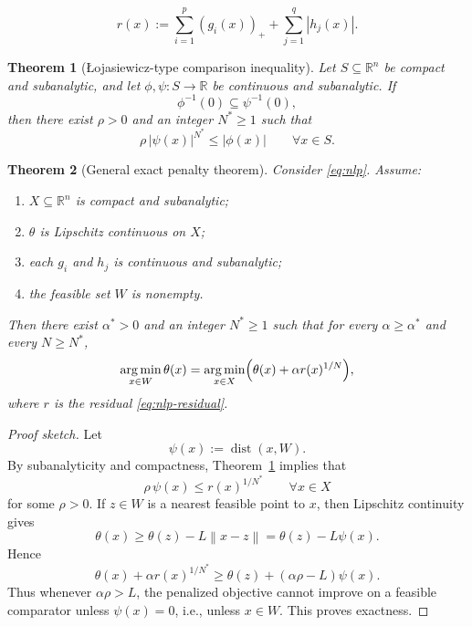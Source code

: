 \documentclass[10pt,a4paper]{amsart}
\newtheorem{theorem}{Theorem}
\newcommand{\R}{\mathbb{R}}
\newcommand{\abs}[1]{\left\lvert #1 \right\rvert}
\newcommand{\argmin}{\operatorname*{arg\,min}}
\newcommand{\dist}{\operatorname{dist}}
\newcommand{\norm}[1]{\left\lVert #1 \right\rVert}
\newcommand{\pos}[1]{\left(#1\right)_{+}}
\begin{document}
\begin{equation}
\label{eq:nlp-residual}
r(x):=\sum_{i=1}^p \pos{g_i(x)}+\sum_{j=1}^q \abs{h_j(x)}.
\end{equation}

\begin{theorem}[Łojasiewicz-type comparison inequality]
\label{thm:loja}
Let $S\subseteq \R^n$ be compact and subanalytic, and let $\phi,\psi:S\to\R$ be continuous and subanalytic. If
\[
\phi^{-1}(0)\subseteq \psi^{-1}(0),
\]
then there exist $\rho>0$ and an integer $N^\ast\ge 1$ such that
\[
\rho\,\abs{\psi(x)}^{N^\ast}\le \abs{\phi(x)}\qquad \forall x\in S.
\]
\end{theorem}

\begin{theorem}[General exact penalty theorem]
\label{thm:general-exact}
Consider \eqref{eq:nlp}. Assume:
\begin{enumerate}[label=(\roman*)]
    \item $X\subseteq \R^n$ is compact and subanalytic;
    \item $\theta$ is Lipschitz continuous on $X$;
    \item each $g_i$ and $h_j$ is continuous and subanalytic;
    \item the feasible set $W$ is nonempty.
\end{enumerate}
Then there exist $\alpha^\ast>0$ and an integer $N^\ast\ge 1$ such that for every $\alpha\ge \alpha^\ast$ and every $N\ge N^\ast$,
\[
\argmin_{x\in W}\theta(x)
=
\argmin_{x\in X}\Bigl(\theta(x)+\alpha r(x)^{1/N}\Bigr),
\]
where $r$ is the residual \eqref{eq:nlp-residual}.
\end{theorem}

\begin{proof}[Proof sketch]
Let
\[
\psi(x):=\dist(x,W).
\]
By subanalyticity and compactness, Theorem~\ref{thm:loja} implies that
\[
\rho\,\psi(x)\le r(x)^{1/N^\ast}\qquad \forall x\in X
\]
for some $\rho>0$. If $z\in W$ is a nearest feasible point to $x$, then Lipschitz continuity gives
\[
\theta(x)\ge \theta(z)-L\norm{x-z}=\theta(z)-L\psi(x).
\]
Hence
\[
\theta(x)+\alpha r(x)^{1/N^\ast}
\ge
\theta(z)+(\alpha\rho-L)\psi(x).
\]
Thus whenever $\alpha\rho>L$, the penalized objective cannot improve on a feasible comparator unless $\psi(x)=0$, i.e., unless $x\in W$. This proves exactness.
\end{proof}
\end{document}
